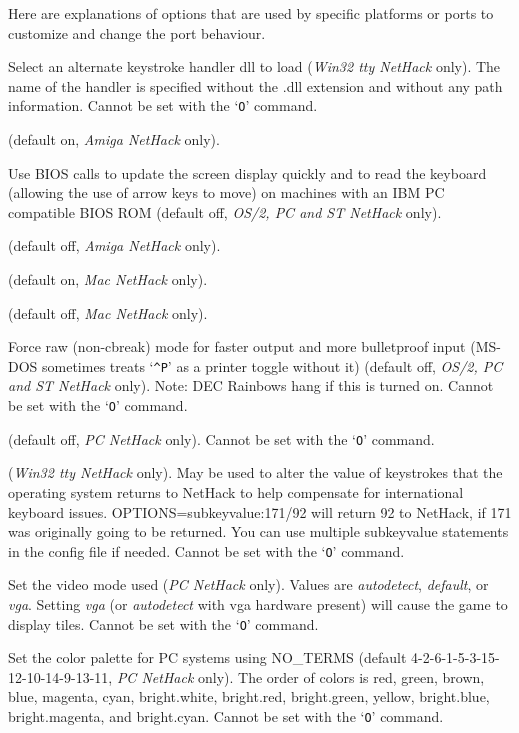Here are explanations of options that are used by specific platforms 
or ports to customize and change the port behaviour.

\blist{}
\item[\ib{altkeyhandler}]
Select an alternate keystroke handler dll to load ({\it Win32 tty\/ NetHack\/} only).
The name of the handler is specified without the .dll extension and without any
path information.
Cannot be set with the `{\tt O}' command.
\item[\ib{altmeta}]
(default on, {\it Amiga NetHack \/} only).
\item[\ib{BIOS}]
Use BIOS calls to update the screen display quickly and to read the keyboard
(allowing the use of arrow keys to move) on machines with an IBM PC
compatible BIOS ROM (default off, {\it OS/2, PC\/ {\rm and} ST NetHack\/} only).
\item[\ib{flush}]
(default off, {\it Amiga NetHack \/} only).
\item[\ib{Macgraphics}]
(default on, {\it Mac NetHack \/} only).
\item[\ib{page\_wait}]
(default off, {\it Mac NetHack \/} only).
\item[\ib{rawio}]
Force raw (non-cbreak) mode for faster output and more
bulletproof input (MS-DOS sometimes treats `{\tt \^{}P}' as a printer toggle
without it) (default off, {\it OS/2, PC\/ {\rm and} ST NetHack\/} only).  
Note:  DEC Rainbows hang if this is turned on.
Cannot be set with the `{\tt O}' command.
\item[\ib{soundcard}]
(default off, {\it PC NetHack \/} only).
Cannot be set with the `{\tt O}' command.
\item[\ib{subkeyval}]
({\it Win32 tty NetHack \/} only).
May be used to alter the value of keystrokes that the operating system
returns to NetHack to help compensate for international keyboard issues.
OPTIONS=subkeyvalue:171/92
will return 92 to NetHack, if 171 was originally going to be returned.
You can use multiple subkeyvalue statements in the config file if needed.
Cannot be set with the `{\tt O}' command.
\item[\ib{video}]
Set the video mode used ({\it PC\/ NetHack\/} only).
Values are {\it autodetect\/}, {\it default\/}, or {\it vga\/}. 
Setting {\it vga\/} (or {\it autodetect\/} with vga hardware present) will cause
the game to display tiles. 
Cannot be set with the `{\tt O}' command.
\item[\ib{videocolors}]
\begin{sloppypar}
Set the color palette for PC systems using NO\_TERMS
(default 4-2-6-1-5-3-15-12-10-14-9-13-11, {\it PC\/ NetHack\/} only).
The order of colors is red, green, brown, blue, magenta, cyan,
bright.white, bright.red, bright.green, yellow, bright.blue,
bright.magenta, and bright.cyan.
Cannot be set with the `{\tt O}' command.
\end{sloppypar}
